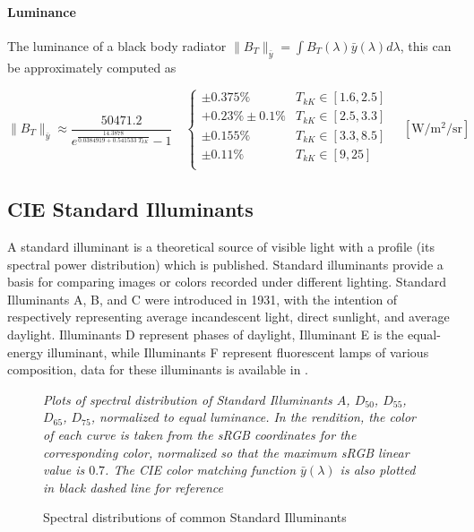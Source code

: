 \paragraph{Luminance}

The luminance of a black body radiator $\|B_T\|_{\bar y} = \int B_T(\lambda)\bar y(\lambda) d\lambda$,
this can be approximately computed as

\begin{equation}
\|B_T\|_{\bar y} \approx \frac{50471.2}{e^{\frac{14.3878}{0.0384919 +
0.541533\; T_{kK}}}-1}
\quad \left\{\begin{array}{cl}
\pm 0.375\% & T_{kK} \in [1.6, 2.5] \\
+0.23\% \pm 0.1\% & T_{kK} \in [2.5, 3.3] \\
\pm 0.155\% & T_{kK} \in [3.3, 8.5] \\
\pm 0.11\%  & T_{kK} \in [9, 25] \\
\end{array}\right.
\quad \left[\unit{\watt\per\square\meter\per\steradian}\right]
\end{equation}


\subsection{CIE Standard Illuminants}

A standard illuminant is a theoretical source of visible light with a profile
(its spectral
power distribution) which is published. Standard illuminants provide a basis for
comparing
images or colors recorded under different lighting. Standard Illuminants A, B,
and C were
introduced in 1931, with the intention of respectively representing average
incandescent light,
direct sunlight, and average daylight. Illuminants D represent phases of
daylight, Illuminant E
is the equal-energy illuminant, while Illuminants F represent fluorescent lamps
of various
composition, data for these illuminants is available in \cite{stdilluminants}.

\begin{figure}
{
\small
\centering
\resizebox{\linewidth}{!}{}
\caption{Spectral distributions of common Standard Illuminants}
\label{fig:illumspectra}
}
\vskip 1mm
{\footnotesize\it Plots of spectral distribution of
Standard Illuminants $A$, $D_{50}$, $D_{55}$, $D_{65}$, $D_{75}$,
normalized to equal luminance.
In the rendition, the color of each curve is taken from the
sRGB coordinates for the corresponding color,
normalized so that the maximum sRGB linear value is $0.7$.
The CIE color matching function $\bar y (\lambda)$ is also plotted in
black dashed line for reference}
\end{figure}

